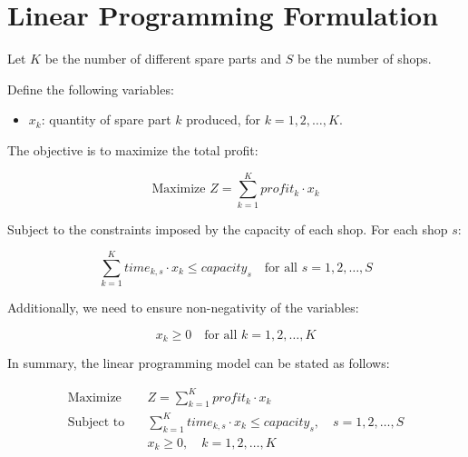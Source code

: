 \documentclass{article}
\begin{document}
\section*{Linear Programming Formulation}

Let \( K \) be the number of different spare parts and \( S \) be the number of shops. 

Define the following variables:

\begin{itemize}
    \item \( x_k \): quantity of spare part \( k \) produced, for \( k = 1, 2, \ldots, K \).
\end{itemize}

The objective is to maximize the total profit:

\[
\text{Maximize } Z = \sum_{k=1}^{K} profit_k \cdot x_k
\]

Subject to the constraints imposed by the capacity of each shop. For each shop \( s \):

\[
\sum_{k=1}^{K} time_{k,s} \cdot x_k \leq capacity_s \quad \text{for all } s = 1, 2, \ldots, S
\]

Additionally, we need to ensure non-negativity of the variables:

\[
x_k \geq 0 \quad \text{for all } k = 1, 2, \ldots, K
\]

In summary, the linear programming model can be stated as follows:

\begin{align*}
\text{Maximize} \quad & Z = \sum_{k=1}^{K} profit_k \cdot x_k \\
\text{Subject to} \quad & \sum_{k=1}^{K} time_{k,s} \cdot x_k \leq capacity_s, \quad s = 1, 2, \ldots, S \\
& x_k \geq 0, \quad k = 1, 2, \ldots, K
\end{align*}
\end{document}
